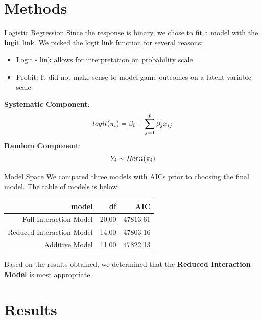 \documentclass{beamer}
\begin{document}
	
	\section{Methods}
	
	\begin{frame}[t]{Logistic Regression}
	Since the response is binary, we chose to fit a model with the \textbf{logit} link. We picked the logit link function for several reasons: 
	\begin{itemize}
		\item Logit - link allows for interpretation on probability scale
		\item Probit: It did not make sense to model game outcomes on a latent variable scale
		
	\end{itemize}
\textbf{Systematic Component}: 
\begin{eqnarray} \label{eq:logit}
\centering
logit(\pi_{i})=\beta_{0}+\sum_{j=1}^{p} \beta_{j}x_{ij}
\end{eqnarray} 
\textbf{Random Component}: 
\begin{equation}
\centering
Y_i \sim Bern(\pi_i)
\end{equation}
	\end{frame}
	

	
	
\begin{frame}{Model Space}
We compared three models with AICs prior to choosing the final model. The table of models is below: 
\begin{table}[ht]
	\centering
	\begin{tabular}{rrr}
		\hline
	model	& df & AIC \\ 
		\hline
		Full Interaction Model & 20.00 & 47813.61 \\ 
		Reduced Interaction Model & 14.00 & 47803.16 \\ 
		Additive Model & 11.00 & 47822.13 \\ 
		\hline
	\end{tabular}
\end{table} 

Based on the results obtained, we determined that the \textbf{Reduced Interaction Model} is most appropriate.
\end{frame}
	
	
\section{Results}
\end{document}
